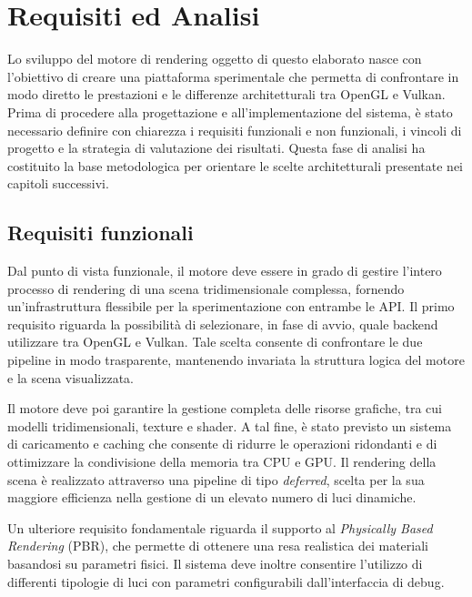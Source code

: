 \documentclass[12pt,a4paper,openright,twoside]{book}
\begin{document}
\chapter{Requisiti ed Analisi}
\label{chap:analysis}

Lo sviluppo del motore di rendering oggetto di questo elaborato nasce con l'obiettivo di creare una piattaforma
sperimentale che permetta di confrontare in modo diretto le prestazioni e le differenze architetturali tra
OpenGL e Vulkan. Prima di procedere alla progettazione e all'implementazione del sistema, è stato necessario
definire con chiarezza i requisiti funzionali e non funzionali, i vincoli di progetto e la strategia di valutazione
dei risultati. Questa fase di analisi ha costituito la base metodologica per orientare le scelte architetturali
presentate nei capitoli successivi.

\section{Requisiti funzionali}
Dal punto di vista funzionale, il motore deve essere in grado di gestire l'intero processo di rendering di una
scena tridimensionale complessa, fornendo un'infrastruttura flessibile per la sperimentazione con entrambe le API.
Il primo requisito riguarda la possibilità di selezionare, in fase di avvio, quale backend utilizzare tra OpenGL e
Vulkan. Tale scelta consente di confrontare le due pipeline in modo trasparente, mantenendo invariata la struttura
logica del motore e la scena visualizzata.

Il motore deve poi garantire la gestione completa delle risorse grafiche, tra cui modelli tridimensionali, texture e
shader. A tal fine, è stato previsto un sistema di caricamento e caching che consente di ridurre le operazioni ridondanti
e di ottimizzare la condivisione della memoria tra CPU e GPU. Il rendering della scena è realizzato attraverso una
pipeline di tipo \emph{deferred}, scelta per la sua maggiore efficienza nella gestione di un elevato numero di luci
dinamiche.

Un ulteriore requisito fondamentale riguarda il supporto al \emph{Physically Based Rendering} (PBR), che permette
di ottenere una resa realistica dei materiali basandosi su parametri fisici. Il sistema deve inoltre consentire
l'utilizzo di differenti tipologie di luci con parametri configurabili dall'interfaccia di debug.
\end{document}
